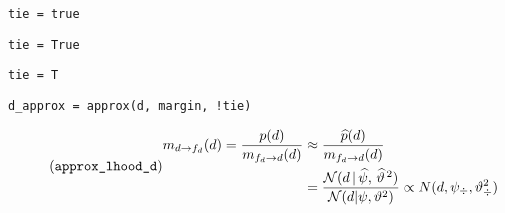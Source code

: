 \documentclass[article]{jss}
\newif\ifen
\newif\ifes
\newcommand{\en}[1]{\ifen#1\fi}
\newcommand{\es}[1]{\ifes#1\fi}
\newcommand{\N}{\mathcal{N}}
\begin{document}
%
\begin{lstlisting}[backgroundcolor=\color
{white},label=lst:d_approx, caption=\relax, belowskip=-1.0 \baselineskip, aboveskip=-0 \baselineskip]
\end{lstlisting}
\begin{paracol}{3}
\begin{lstlisting}[backgroundcolor=\color{julia},belowskip=-0.77 \baselineskip]
tie = true
\end{lstlisting}
\switchcolumn
\begin{lstlisting}[backgroundcolor=\color{python},belowskip=-0.77 \baselineskip]
tie = True
\end{lstlisting}
\switchcolumn
\begin{lstlisting}[backgroundcolor=\color{r},belowskip=-0.77 \baselineskip]
tie = T
\end{lstlisting}
\end{paracol}
\begin{lstlisting}[backgroundcolor=\color{all}]
d_approx = approx(d, margin, !tie)
\end{lstlisting}
%
\en{Where the difference distribution \texttt{d} was initialized in code~\ref{lst:difference_performance}, and the variable \texttt{margin} in code~\ref{lst:draw}.}
\es{Donde la distribución de diferencias \texttt{d} fue inicializada en el código~\ref{lst:difference_performance}, y \texttt{margin} en el código~\ref{lst:draw}.}
%
\en{Given $\widehat{p}(d)$, we can compute the approximate ascending message.}
\es{Dada $\widehat{p}(d)$, podemos calcular el mensaje ascendentes aproximado.}
%
\en{Recall that any marginal distribution can be calculated as the product of the messages received from all its neighboring factors, and that in this case due to the factorization of the model, it holds that $ m_{f_r \rightarrow d}(d) = m_{d \rightarrow f_{d}}(d)$.}
\es{Recordar que la distribución marginal se puede calcular como el producto de los mensajes que le envían todos los factores vecinos, y que en este caso por la factorización del modelo, el mensaje $ m_{f_r \rightarrow d}(d) = m_{d \rightarrow f_{d}}(d)$.}
%
\en{Then, the approximate ascending message is,}
\es{Luego, el mensaje aproximado ascendente es,}
%
\begin{equation}\label{eq:m^_d_fd} \tag{\texttt{approx\_lhood\_d}}
\begin{split}
 m_{d \rightarrow f_{d}}(d)   = \frac{p(d)}{m_{f_{d} \rightarrow d}(d)} 
 & \approx \frac{\widehat{p}(d)}{m_{f_{d} \rightarrow d}(d)}  \\
& = \frac{\N(d \,  | \,\widehat{\psi} , \, \widehat{\vartheta}^{\,2} )}{\N(d | \psi, \vartheta^2)} 
\propto N(d,\psi_{\div},\vartheta_{\div}^2 )
\end{split}
\end{equation}
\end{document}
